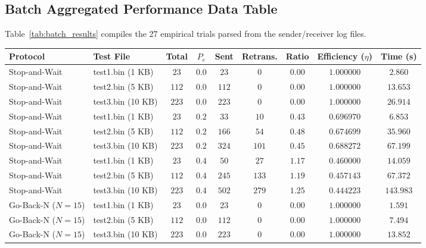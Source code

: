 \documentclass[11pt,a4paper]{article}
\begin{document}
\subsection{Batch Aggregated Performance Data Table}
Table~\ref{tab:batch_results} compiles the 27 empirical trials parsed from the sender/receiver log files.
\begin{table}[htbp]
\centering
\tiny
\renewcommand{\arraystretch}{1.12}
\begin{tabular}{l l c c c c c c c}
\rowcolor{tableheader}
\color{white}Protocol & \color{white}Test File & \color{white}Total & \color{white}$P_e$ & \color{white}Sent & \color{white}Retrans. & \color{white}Ratio & \color{white}Efficiency ($\eta$) & \color{white}Time (s) \\
\hline
Stop-and-Wait & test1.bin (1 KB) & $23$ & $0.0$ & $23$ & $0$ & $0.00$ & $1.000000$ & $2.860$ \\
Stop-and-Wait & test2.bin (5 KB) & $112$ & $0.0$ & $112$ & $0$ & $0.00$ & $1.000000$ & $13.653$ \\
Stop-and-Wait & test3.bin (10 KB) & $223$ & $0.0$ & $223$ & $0$ & $0.00$ & $1.000000$ & $26.914$ \\
\rowcolor{softblue!20} Stop-and-Wait & test1.bin (1 KB) & $23$ & $0.2$ & $33$ & $10$ & $0.43$ & $0.696970$ & $6.853$ \\
\rowcolor{softblue!20} Stop-and-Wait & test2.bin (5 KB) & $112$ & $0.2$ & $166$ & $54$ & $0.48$ & $0.674699$ & $35.960$ \\
\rowcolor{softblue!20} Stop-and-Wait & test3.bin (10 KB) & $223$ & $0.2$ & $324$ & $101$ & $0.45$ & $0.688272$ & $67.199$ \\
\rowcolor{lightgold} Stop-and-Wait & test1.bin (1 KB) & $23$ & $0.4$ & $50$ & $27$ & $1.17$ & $0.460000$ & $14.059$ \\
\rowcolor{lightgold} Stop-and-Wait & test2.bin (5 KB) & $112$ & $0.4$ & $245$ & $133$ & $1.19$ & $0.457143$ & $67.372$ \\
\rowcolor{lightgold} Stop-and-Wait & test3.bin (10 KB) & $223$ & $0.4$ & $502$ & $279$ & $1.25$ & $0.444223$ & $143.983$ \\
\hline
Go-Back-N ($N=15$) & test1.bin (1 KB) & $23$ & $0.0$ & $23$ & $0$ & $0.00$ & $1.000000$ & $1.591$ \\
Go-Back-N ($N=15$) & test2.bin (5 KB) & $112$ & $0.0$ & $112$ & $0$ & $0.00$ & $1.000000$ & $7.494$ \\
Go-Back-N ($N=15$) & test3.bin (10 KB) & $223$ & $0.0$ & $223$ & $0$ & $0.00$ & $1.000000$ & $13.852$ \\

\end{tabular}
\end{table}
\end{document}
